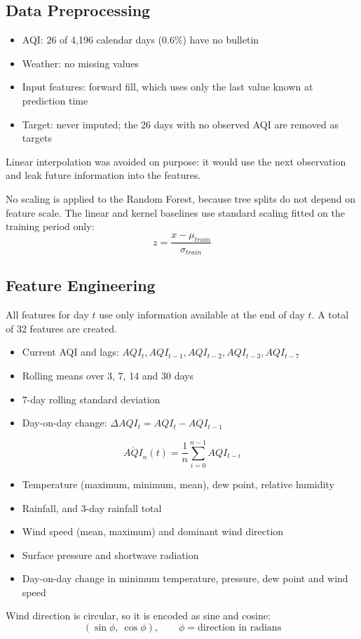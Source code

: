\subsection{Data Preprocessing}

\begin{itemize}
\item AQI: 26 of 4,196 calendar days (0.6\%) have no bulletin
\item Weather: no missing values
\item Input features: forward fill, which uses only the last value known at prediction time
\item Target: never imputed; the 26 days with no observed AQI are removed as targets
\end{itemize}
Linear interpolation was avoided on purpose: it would use the next observation and leak future information into the features.

No scaling is applied to the Random Forest, because tree splits do not depend on feature scale. The linear and kernel baselines use standard scaling fitted on the training period only:
\begin{equation}
z = \frac{x - \mu_{train}}{\sigma_{train}}
\end{equation}

\subsection{Feature Engineering}
All features for day $t$ use only information available at the end of day $t$. A total of 32 features are created.

\begin{itemize}
\item Current AQI and lags: $AQI_t, AQI_{t-1}, AQI_{t-2}, AQI_{t-3}, AQI_{t-7}$
\item Rolling means over 3, 7, 14 and 30 days
\item 7-day rolling standard deviation
\item Day-on-day change: $\Delta AQI_t = AQI_t - AQI_{t-1}$
\end{itemize}
\begin{equation}
\overline{AQI}_n(t) = \frac{1}{n}\sum_{i=0}^{n-1} AQI_{t-i}
\end{equation}

\begin{itemize}
\item Temperature (maximum, minimum, mean), dew point, relative humidity
\item Rainfall, and 3-day rainfall total
\item Wind speed (mean, maximum) and dominant wind direction
\item Surface pressure and shortwave radiation
\item Day-on-day change in minimum temperature, pressure, dew point and wind speed
\end{itemize}
Wind direction is circular, so it is encoded as sine and cosine:
\begin{equation}
(\sin\phi,\ \cos\phi), \qquad \phi = \text{direction in radians}
\end{equation}

